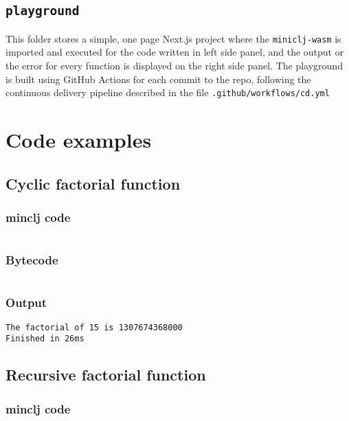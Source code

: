 \documentclass[11pt]{scrreprt}
\begin{document}
\section{\texttt{playground}}
This folder stores a simple, one page Next.js project where the \texttt{miniclj-wasm} is imported and executed for the code written in left side panel, and the output or the error for every function is displayed on the right side panel. The playground is built using GitHub Actions for each commit to the repo, following the continuous delivery pipeline described in the file \texttt{.github/workflows/cd.yml}


\chapter{Code examples}
\label{examples}

\section{Cyclic factorial function}
\subsection{minclj code}
\inputminted{clojure}{/home/mario/git/MarioJim/miniclj/examples/cyclic_factorial.clj}

\subsection{Bytecode}
\inputminted{text}{/home/mario/git/MarioJim/miniclj/examples/cyclic_factorial.mclj}

\subsection{Output}
\begin{verbatim}
The factorial of 15 is 1307674368000
Finished in 26ms
\end{verbatim}


\section{Recursive factorial function}
\subsection{minclj code}
\inputminted{clojure}{/home/mario/git/MarioJim/miniclj/examples/recursive_factorial.clj}
\end{document}

